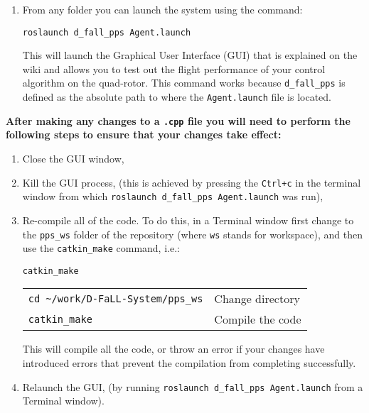 \documentclass[]{report}
\newcommand{\roslaunchcommand}{roslaunch d\_fall\_pps Agent.launch}
\newcommand{\catkinmakefullpath}{\textasciitilde/work/D-FaLL-System/pps\_ws}
\begin{document}
\begin{enumerate}[topsep=-1pt , itemsep=1pt ,  label = \textbf{(\arabic{*})} ]
		
		\item From any folder you can launch the system using the command:
		
		\begin{center}
			\large{\texttt{\roslaunchcommand}}
		\end{center}
	
		This will launch the Graphical User Interface (GUI) that is explained on the wiki and allows you to test out the flight performance of your control algorithm on the quad-rotor. This command works because \texttt{d\_fall\_pps} is defined as the absolute path to where the \texttt{Agent.launch} file is located.
	\end{enumerate}

	\clearpage

	\begin{center}
		\textbf{After making any changes to a \texttt{.cpp} file you will need to perform the following steps to ensure that your changes take effect:}
	\end{center}
	
	\begin{enumerate}[topsep=-1pt , itemsep=1pt ,  label = \textbf{(\arabic{*})} ]
		\item Close the GUI window,
		\item Kill the GUI process, (this is achieved by pressing the \texttt{Ctrl+c} in the terminal window from which \texttt{\roslaunchcommand} was run),
		\item Re-compile all of the code. To do this, in a Terminal window first change to the \texttt{pps\_ws} folder of the repository (where \texttt{ws} stands for workspace), and then use the \texttt{catkin\_make} command, i.e.:
		
		\texttt{catkin\_make}
		
		\begin{center}
			\begin{tabular}{ll}
				\large{\texttt{cd \catkinmakefullpath}}
				& Change directory
				\\
				\large{\texttt{catkin\_make}}
				& Compile the code
			\end{tabular}
		\end{center}
		
		This will compile all the code, or throw an error if your changes have introduced errors that prevent the compilation from completing successfully.
		
		\item Relaunch the GUI, (by running \texttt{\roslaunchcommand} from a Terminal window).
	\end{enumerate}
	
\end{document}
